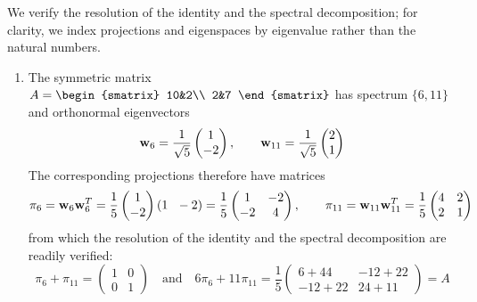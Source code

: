 \pagebreak[3]



\begin{examples}{}{}
	We verify the resolution of the identity and the spectral decomposition; for clarity, we index projections and eigenspaces by eigenvalue rather than the natural numbers.
	\begin{enumerate}
	  \item The symmetric matrix $A=
	  \begin{smatrix}
	  	10&2\\
	  	2&7
	  \end{smatrix}$ has spectrum $\{6,11\}$ and orthonormal eigenvectors
	  \[
		  {\mathbf{w}}_6=\frac 1{\sqrt 5}\begin{pmatrix}1\\-2\end{pmatrix},\qquad 
		  {\mathbf{w}}_{11}=\frac 1{\sqrt 5}\begin{pmatrix}2\\1\end{pmatrix}
	  \]
	  The corresponding projections therefore have matrices
	  \[
	  	\pi_6={\mathbf{w}}_6{\mathbf{w}}_6^T
	  	=\frac 15\begin{pmatrix}1\\-2\end{pmatrix}(1\ \ -2)
	  	=\frac 15
	  	\begin{pmatrix}
	  		1&-2\\
	  		-2&4
	  	\end{pmatrix}
	  	,\qquad
	  	\pi_{11}={\mathbf{w}}_{11}{\mathbf{w}}_{11}^T
	  	=\frac 15
	  	\begin{pmatrix}
	  		4&2\\
	  		2&1
	 		\end{pmatrix}
	 	\]
	  from which the resolution of the identity and the spectral decomposition are readily verified:
	  \[
	  	\pi_6+\pi_{11}=
	  	\begin{pmatrix}
				1&0\\
				0&1
	  	\end{pmatrix}
	  	\quad\text{and}\quad
	  	6\pi_6+11\pi_{11}= \frac 15
	  	\begin{pmatrix}
	  		6+44&-12+22\\
	  		-12+22&24+11
	  	\end{pmatrix}
	  	=A
	  \]
	  

\end{enumerate}
\end{examples}
